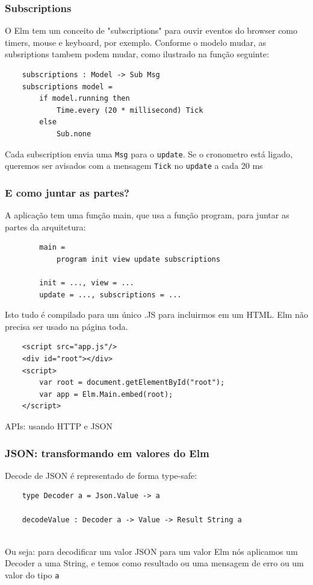 \documentclass[10pt]{beamer}
\begin{document}
\begin{frame}[t, fragile]
	\frametitle{Subscriptions}
	\bigskip
	O Elm tem um conceito de "subscriptions" para ouvir eventos do browser como timers, mouse e keyboard, por exemplo. Conforme o modelo mudar, as subsriptions tambem podem mudar, como ilustrado na função seguinte:
	\bigskip
	\begin{verbatim}
	subscriptions : Model -> Sub Msg
	subscriptions model =
		if model.running then
			Time.every (20 * millisecond) Tick
		else
			Sub.none
	\end{verbatim}
	\bigskip
	Cada subscription envia uma \texttt{Msg} para o \texttt{update}. Se o cronometro está ligado, queremos ser avisados com a mensagem \texttt{Tick} no \texttt{update} a cada 20 ms
\end{frame}

\begin{frame}[t, fragile]
	\frametitle{E como juntar as partes?}
	\medskip
	A aplicação tem uma função main, que usa a função program, para juntar as partes da arquitetura:
	\begin{verbatim}
		main = 
			program init view update subscriptions
			
		init = ..., view = ...
		update = ..., subscriptions = ...
	\end{verbatim}
	\medskip
	Isto tudo é compilado para um único .JS para incluirmos em um HTML. Elm não precisa ser usado na página toda.
	\medskip
	\begin{verbatim}
	<script src="app.js"/>
	<div id="root"></div>
	<script>
		var root = document.getElementById("root");
		var app = Elm.Main.embed(root);
	</script>
	\end{verbatim}
\end{frame}

\begin{frame}
	\Huge{APIs: usando HTTP e JSON}
\end{frame}

\begin{frame}[fragile]
\frametitle{JSON: transformando em valores do Elm}
Decode de JSON é representado de forma type-safe:
\\
\begin{verbatim}
    type Decoder a = Json.Value -> a

    decodeValue : Decoder a -> Value -> Result String a
\end{verbatim}
\
\\
Ou seja: para decodificar um valor JSON para um valor Elm nós aplicamos um Decoder a uma String, e temos como resultado ou uma mensagem de erro ou um valor do tipo \verb|a|
\end{frame}
\end{document}

